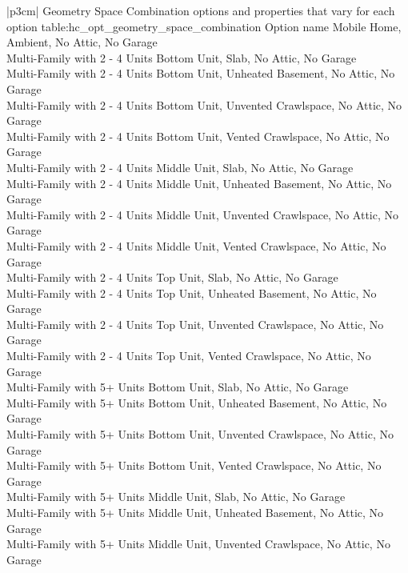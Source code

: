 \begin{customLongTable}{ |p{3cm}| }
{Geometry Space Combination options and properties that vary for each option} {table:hc_opt_geometry_space_combination}
{Option name}
Mobile Home, Ambient, No Attic, No Garage \\ \hline
Multi-Family with 2 - 4 Units Bottom Unit, Slab, No Attic, No Garage \\ \hline
Multi-Family with 2 - 4 Units Bottom Unit, Unheated Basement, No Attic, No Garage \\ \hline
Multi-Family with 2 - 4 Units Bottom Unit, Unvented Crawlspace, No Attic, No Garage \\ \hline
Multi-Family with 2 - 4 Units Bottom Unit, Vented Crawlspace, No Attic, No Garage \\ \hline
Multi-Family with 2 - 4 Units Middle Unit, Slab, No Attic, No Garage \\ \hline
Multi-Family with 2 - 4 Units Middle Unit, Unheated Basement, No Attic, No Garage \\ \hline
Multi-Family with 2 - 4 Units Middle Unit, Unvented Crawlspace, No Attic, No Garage \\ \hline
Multi-Family with 2 - 4 Units Middle Unit, Vented Crawlspace, No Attic, No Garage \\ \hline
Multi-Family with 2 - 4 Units Top Unit, Slab, No Attic, No Garage \\ \hline
Multi-Family with 2 - 4 Units Top Unit, Unheated Basement, No Attic, No Garage \\ \hline
Multi-Family with 2 - 4 Units Top Unit, Unvented Crawlspace, No Attic, No Garage \\ \hline
Multi-Family with 2 - 4 Units Top Unit, Vented Crawlspace, No Attic, No Garage \\ \hline
Multi-Family with 5+ Units Bottom Unit, Slab, No Attic, No Garage \\ \hline
Multi-Family with 5+ Units Bottom Unit, Unheated Basement, No Attic, No Garage \\ \hline
Multi-Family with 5+ Units Bottom Unit, Unvented Crawlspace, No Attic, No Garage \\ \hline
Multi-Family with 5+ Units Bottom Unit, Vented Crawlspace, No Attic, No Garage \\ \hline
Multi-Family with 5+ Units Middle Unit, Slab, No Attic, No Garage \\ \hline
Multi-Family with 5+ Units Middle Unit, Unheated Basement, No Attic, No Garage \\ \hline
Multi-Family with 5+ Units Middle Unit, Unvented Crawlspace, No Attic, No Garage \\ \hline

\end{customLongTable}
